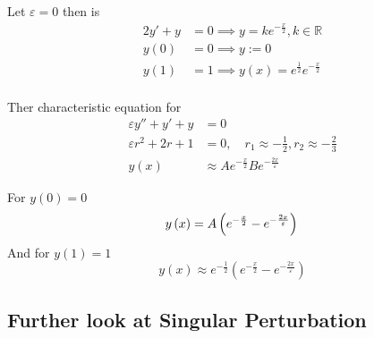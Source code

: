 \documentclass{article}
\theoremstyle{remark}
\begin{document}
Let $\varepsilon  = 0$ then is \[
\begin{split}
2 y'  + y &= 0 \implies  y = k  e ^{ -\frac{x}{2}} , k \in  \mathbb{R}  \\
y\left( 0 \right) &= 0 \implies  y := 0 \\
y\left( 1 \right) &= 1 \implies  y\left( x \right) = e^{\frac{1}{2}} e^{-\frac{x}{2}} \\
\end{split} 
\] 

Ther characteristic equation for \[
  \begin{split}
\varepsilon y''  + y'  + y &=  0 \\
\varepsilon r ^2 + 2 r + 1 &=  0, \quad  r_{1} \approx -\frac{1}{2} , r_{2} \approx-\frac{2}{3}  \\
y\left( x \right)  &  \approx A e^{-\frac{x}{2}} B e^{ -\frac{2x}{\varepsilon }}
  \end{split} 
\] 


For $y\left( 0 \right) = 0$ \[
y\left( x \right) =  A \left( e ^{ -\frac{x}{2}} - e^{-\frac{2x}{\varepsilon }} \right) \\
\] 
And for $y\left( 1 \right)=1$ \[
y\left( x \right) \approx e^{-\frac{1}{2}} \left( e^{-\frac{x}{2}} - e ^{ -\frac{2x}{\varepsilon }} \right)
\] 



\subsection{Further look at Singular Perturbation}%
\label{sub:further_look_at_singular_perturbation}
\end{document}
